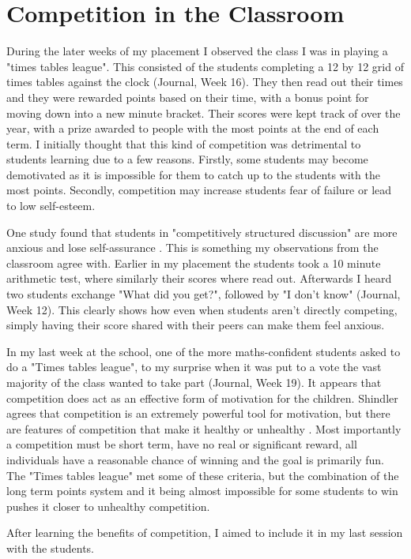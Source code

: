 \documentclass[11pt, a4paper, notitlepage]{article}
\begin{document}
\section*{Competition in the Classroom}
During the later weeks of my placement I observed the class I was in playing a "times tables league". This consisted of the students completing a 12 by 12 grid of times tables against the clock (Journal, Week 16). They then read out their times and they were rewarded points based on their time, with a bonus point for moving down into a new minute bracket. Their scores were kept track of over the year, with a prize awarded to people with the most points at the end of each term. I initially thought that this kind of competition was  detrimental to students learning due to a few reasons. Firstly, some students may become demotivated as it is impossible for them to catch up to the students with the most points. Secondly, competition may increase students fear of failure or lead to low self-esteem. 
\par
One study found that students in "competitively structured discussion" are more anxious and lose self-assurance \cite{Roger:1973}. This is something my observations from the classroom agree with. Earlier in my placement the students took a 10 minute arithmetic test, where similarly their scores where read out. Afterwards I heard two students exchange "What did you get?", followed by "I don't know" (Journal, Week 12). This clearly shows how even when students aren't directly competing, simply having their score shared with their peers can make them feel anxious. 
\par
In my last week at the school, one of the more maths-confident students asked to do a "Times tables league", to my surprise when it was put to a vote the vast majority of the class wanted to take part (Journal, Week 19). It appears that competition does act as an effective form of motivation for the children. Shindler agrees that competition is an extremely powerful tool for motivation, but there are features of competition that make it healthy or unhealthy \cite{Shindler:2009}. Most importantly a competition must be short term, have no real or significant reward, all individuals have a reasonable chance of winning and the goal is primarily fun. The "Times tables league" met some of these criteria, but the combination of the long term points system and it being almost impossible for some students to win pushes it closer to unhealthy competition. 
\par
After learning the benefits of competition, I aimed to include it in my last session with the students. 
\end{document}
